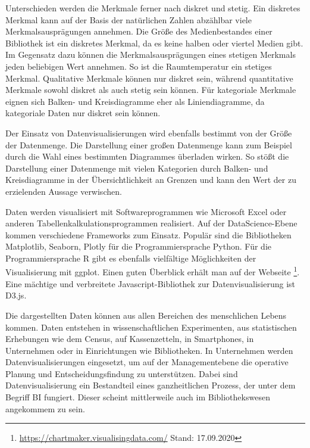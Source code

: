 Unterschieden werden die Merkmale ferner nach diskret und stetig.
Ein diskretes Merkmal kann auf der Basis der natürlichen Zahlen abzählbar viele Merkmalsausprägungen annehmen.
Die Größe des Medienbestandes einer Bibliothek ist ein diskretes Merkmal, da es keine halben oder viertel Medien gibt.
Im Gegensatz dazu können die Merkmalsausprägungen eines stetigen Merkmals jeden beliebigen Wert annehmen. So ist die Raumtemperatur ein stetiges Merkmal.
Qualitative Merkmale können nur diskret sein, während quantitative Merkmale sowohl diskret als auch stetig sein können. 
Für kategoriale Merkmale eignen sich Balken- und Kreisdiagramme eher als Liniendiagramme, da kategoriale Daten nur diskret sein können.

Der Einsatz von Datenvisualisierungen wird ebenfalls bestimmt von der Größe der Datenmenge.
Die Darstellung einer großen Datenmenge kann zum Beispiel durch die Wahl eines bestimmten Diagrammes überladen wirken. 
So stößt die Darstellung einer Datenmenge mit vielen Kategorien durch Balken- und Kreisdiagramme 
in der Übersichtlichkeit an Grenzen und kann den Wert der zu erzielenden Aussage verwischen. 

Daten werden visualisiert mit Softwareprogrammen wie Microsoft Excel oder anderen Tabellenkalkulationsprogrammen realisiert.
Auf der DataScience-Ebene kommen verschiedene Frameworks zum Einsatz. Populär sind die Bibliotheken Matplotlib, Seaborn, Plotly für 
die Programmiersprache Python. Für die Programmiersprache R gibt es ebenfalls vielfältige Möglichkeiten der Visualisierung mit
ggplot. Einen guten Überblick erhält man auf der Webseite \footnote{\url{https://chartmaker.visualisingdata.com/} Stand: 17.09.2020}.
Eine mächtige und verbreitete Javascript-Bibliothek zur Datenvisualisierung ist D3.js.


Die dargestellten Daten können aus allen Bereichen des menschlichen Lebens kommen. Daten entstehen in wissenschaftlichen Experimenten, aus statistischen Erhebungen wie 
dem Census, auf Kassenzetteln, in Smartphones, in Unternehmen oder in Einrichtungen wie Bibliotheken. 
In Unternehmen werden Datenvisualisierungen eingesetzt, um auf der Managementebene die operative Planung und Entscheidungsfindung zu unterstützen.
Dabei sind Datenvisualisierung ein Bestandteil eines ganzheitlichen Prozess, der unter dem Begriff \acrfull{BI} fungiert. Dieser scheint mittlerweile auch im Bibliothekswesen angekommem zu sein.



